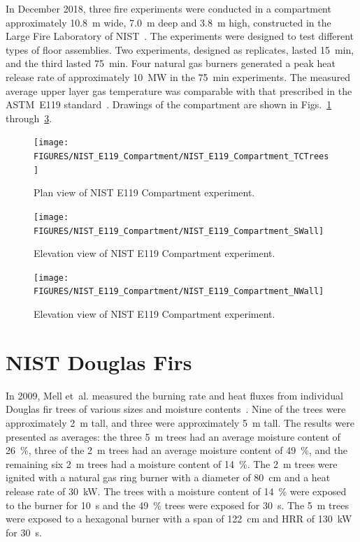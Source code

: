 In December 2018, three fire experiments were conducted in a compartment approximately 10.8~m wide, 7.0~m deep and 3.8~m high, constructed in the Large Fire Laboratory of NIST~\cite{Ana:TNXXXX}. The experiments were designed to test different types of floor assemblies. Two experiments, designed as replicates, lasted 15~min, and the third lasted 75~min. Four natural gas burners generated a peak heat release rate of approximately 10~MW in the 75~min experiments. The measured average upper layer gas temperature was comparable with that prescribed in the ASTM~E119 standard~\cite{E119}. Drawings of the compartment are shown in Figs.~\ref{NIST_E119_Compartment_Drawing_1} through~\ref{NIST_E119_Compartment_Drawing_3}.

\begin{figure}
\texttt{[image: FIGURES/NIST\_E119\_Compartment/NIST\_E119\_Compartment\_TCTrees]}
\caption[Plan view of NIST E119 Compartment experiment]{Plan view of NIST E119 Compartment experiment.}
\label{NIST_E119_Compartment_Drawing_1}
\end{figure}

\begin{figure}
\texttt{[image: FIGURES/NIST\_E119\_Compartment/NIST\_E119\_Compartment\_SWall]}
\caption[Elevation view of NIST E119 Compartment experiment]{Elevation view of NIST E119 Compartment experiment.}
\label{NIST_E119_Compartment_Drawing_2}
\end{figure}

\begin{figure}
\texttt{[image: FIGURES/NIST\_E119\_Compartment/NIST\_E119\_Compartment\_NWall]}
\caption[Elevation view of NIST E119 Compartment experiment]{Elevation view of NIST E119 Compartment experiment.}
\label{NIST_E119_Compartment_Drawing_3}
\end{figure}

\FloatBarrier

\section{NIST Douglas Firs}
\label{NIST_Douglas_Firs_Description}

In 2009, Mell et~al. measured the burning rate and heat fluxes from individual Douglas fir trees of various sizes and moisture contents~\cite{Mell:2009}. Nine of the trees were approximately 2~m tall, and three were approximately 5~m tall. The results were presented as averages: the three 5~m trees had an average moisture content of 26~\%, three of the 2~m trees had an average moisture content of 49~\%, and the remaining six 2~m trees had a moisture content of 14~\%. The 2~m trees were ignited with a natural gas ring burner with a diameter of 80~cm and a heat release rate of 30~kW. The trees with a moisture content of 14~\% were exposed to the burner for 10~s and the 49~\% trees were exposed for 30~s. The 5~m trees were exposed to a hexagonal burner with a span of 122~cm and HRR of 130~kW for 30~s.

